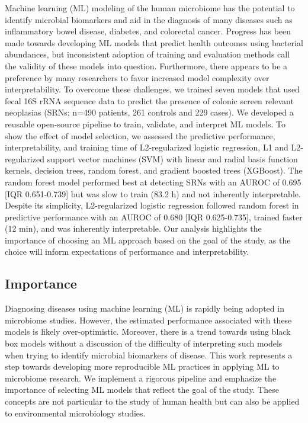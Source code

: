\documentclass[11pt,]{article}
\begin{document}
Machine learning (ML) modeling of the human microbiome has the potential
to identify microbial biomarkers and aid in the diagnosis of many
diseases such as inflammatory bowel disease, diabetes, and colorectal
cancer. Progress has been made towards developing ML models that predict
health outcomes using bacterial abundances, but inconsistent adoption of
training and evaluation methods call the validity of these models into
question. Furthermore, there appears to be a preference by many
researchers to favor increased model complexity over interpretability.
To overcome these challenges, we trained seven models that used fecal
16S rRNA sequence data to predict the presence of colonic screen
relevant neoplasias (SRNs; n=490 patients, 261 controls and 229 cases).
We developed a reusable open-source pipeline to train, validate, and
interpret ML models. To show the effect of model selection, we assessed
the predictive performance, interpretability, and training time of
L2-regularized logistic regression, L1 and L2-regularized support vector
machines (SVM) with linear and radial basis function kernels, decision
trees, random forest, and gradient boosted trees (XGBoost). The random
forest model performed best at detecting SRNs with an AUROC of 0.695
{[}IQR 0.651-0.739{]} but was slow to train (83.2 h) and not inherently
interpretable. Despite its simplicity, L2-regularized logistic
regression followed random forest in predictive performance with an
AUROC of 0.680 {[}IQR 0.625-0.735{]}, trained faster (12 min), and was
inherently interpretable. Our analysis highlights the importance of
choosing an ML approach based on the goal of the study, as the choice
will inform expectations of performance and interpretability.

\newpage

\subsection{Importance}\label{importance}

Diagnosing diseases using machine learning (ML) is rapidly being adopted
in microbiome studies. However, the estimated performance associated
with these models is likely over-optimistic. Moreover, there is a trend
towards using black box models without a discussion of the difficulty of
interpreting such models when trying to identify microbial biomarkers of
disease. This work represents a step towards developing more
reproducible ML practices in applying ML to microbiome research. We
implement a rigorous pipeline and emphasize the importance of selecting
ML models that reflect the goal of the study. These concepts are not
particular to the study of human health but can also be applied to
environmental microbiology studies.
\end{document}
